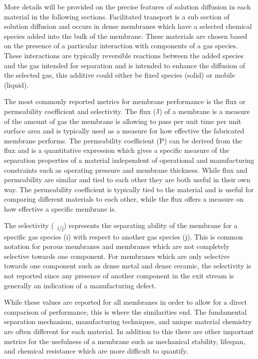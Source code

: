 More details will be provided on the precise features of solution diffusion in each material in the following 
sections. Facilitated transport is a sub section of solution diffusion and occurs in dense membranes which 
have a selected chemical species added into the bulk of the membrane. These materials are chosen based on the 
presence of a particular interaction with components of a gas species. These interactions are typically 
reversible reactions between the added species and the gas intended for separation and is intended to enhance 
the diffusion of the selected gas, this additive could either be fixed species (solid) or mobile (liquid). 

The most commonly reported metrics for membrane performance is the flux or permeability coefficient and 
selectivity. The flux (J) of a membrane is a measure of the amount of gas the membrane is allowing to pass 
per unit time per unit surface area and is typically used as a measure for how effective the fabricated 
membrane performs. The permeability coefficient (P) can be derived from the flux and is a quantitative 
expression which gives a specific measure of the separation properties of a material independent of 
operational and manufacturing constraints such as operating pressure and membrane thickness. 
While flux and permeability are similar and tied to each other they are both useful in their own way. 
The permeability coefficient is typically tied to the material and is useful for comparing different 
materials to each other, while the flux offers a measure on how effective a specific membrane is. 

The selectivity (\textalpha \ \textsubscript{i/j}) represents the separating ability of the membrane for a specific gas species 
(i) with respect to another gas species (j). This is common notation for porous membranes and membranes which 
are not completely selective towards one component. For membranes which are only selective towards one 
component such as dense metal and dense ceramic, the selectivity is not reported since any presence of 
another component in the exit stream is generally an indication of a manufacturing defect. 

While these values are reported for all membranes in order to allow for a direct comparison of 
performance, this is where the similarities end. The fundamental separation mechanism, manufacturing 
techniques, and unique material chemistry are often different for each material. In addition to this 
there are other important metrics for the usefulness of a membrane such as mechanical stability, lifespan, 
and chemical resistance which are more difficult to quantify. 


